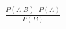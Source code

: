\documentclass[preview]{standalone}
\begin{document}
\begin{align*}
\frac{P(A|B) \cdot P(A)}{P(B)}
\end{align*}
\end{document}
